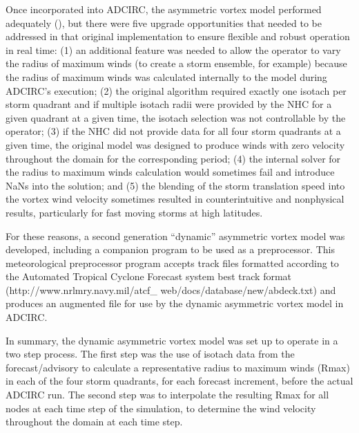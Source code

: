\documentclass[12pt]{article}
\begin{document}
Once incorporated into ADCIRC, the asymmetric vortex model performed 
adequately (\cite{ForbesC2010}), but there were five upgrade 
opportunities that needed to be addressed in that original 
implementation to ensure flexible and robust operation in real time: 
(1) an additional feature was needed to allow the operator to vary 
the radius of maximum winds (to create a storm ensemble, for 
example) because the radius of maximum winds was calculated 
internally to the model during ADCIRC's execution; (2) the original 
algorithm required exactly one isotach per storm quadrant and if 
multiple isotach radii were provided by the NHC for a given quadrant 
at a given time, the isotach selection was not controllable by the 
operator; (3) if the NHC did not provide data for all four storm 
quadrants at a given time, the original model was designed to 
produce winds with zero velocity throughout the domain for the 
corresponding period; (4) the internal solver for the radius to 
maximum winds calculation would sometimes fail and introduce NaNs 
into the solution; and (5) the blending of the storm translation 
speed into the vortex wind velocity sometimes resulted in 
counterintuitive and nonphysical results, particularly for fast 
moving storms at high latitudes.

For these reasons, a second generation ``dynamic'' asymmetric vortex 
model was developed, including a companion program to be used as a 
preprocessor. This meteorological preprocessor program accepts track 
files formatted according to the Automated Tropical Cyclone Forecast 
system best track format (http://www.nrlmry.navy.mil/atcf\_ 
web/docs/database/new/abdeck.txt) and produces an augmented file for 
use by the dynamic asymmetric vortex model in ADCIRC. 

In summary, the dynamic asymmetric vortex model was set up to 
operate in a two step process. The first step was the use of isotach 
data from the forecast/advisory to calculate a representative radius 
to maximum winds (Rmax) in each of the four storm quadrants, for 
each forecast increment, before the actual ADCIRC run. The second 
step was to interpolate the resulting Rmax for all nodes at each 
time step of the simulation, to determine the wind velocity 
throughout the domain at each time step.
\end{document}
